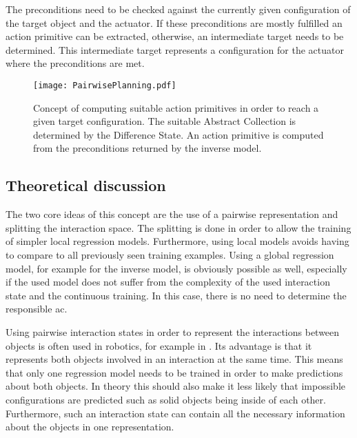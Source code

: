 The preconditions need to be checked against the currently given configuration of the target object and the actuator. If these preconditions are mostly fulfilled an action primitive can be extracted, otherwise, an intermediate target needs to be determined. This intermediate target represents a configuration for the actuator where the preconditions are met.

\begin{figure}
	\centering
	\texttt{[image: PairwisePlanning.pdf]}
	\caption{Concept of computing suitable action primitives in order to reach a given target configuration. The suitable Abstract Collection is determined by the Difference State. An action primitive is computed from the preconditions returned by the inverse model.} 
	\label{fig:PairPlanning}
\end{figure}


\subsection{Theoretical discussion \label{sec:interactionTheory}}
The two core ideas of this concept are the use of a pairwise representation and splitting the interaction space. The splitting is done in order to allow the training of simpler local regression models. Furthermore, using local models avoids having to compare to all previously seen training examples. 
Using a global regression model, for example for the inverse model, is obviously possible as well, especially if the used model does not suffer from the complexity of the used interaction state and the continuous training. In this case, there is no need to determine the responsible \acrlong{ac}.

Using pairwise interaction states in order to represent the interactions between objects is often used in robotics, for example in \cite{pairwiseExamples}. 
Its advantage is that it represents both objects involved in an interaction at the same time. This means that only one regression model needs to be trained in order to make predictions about both objects. In theory this should also make it less likely that impossible configurations are predicted such as solid objects being inside of each other. Furthermore, such an interaction state can contain all the necessary information about the objects in one representation. 

